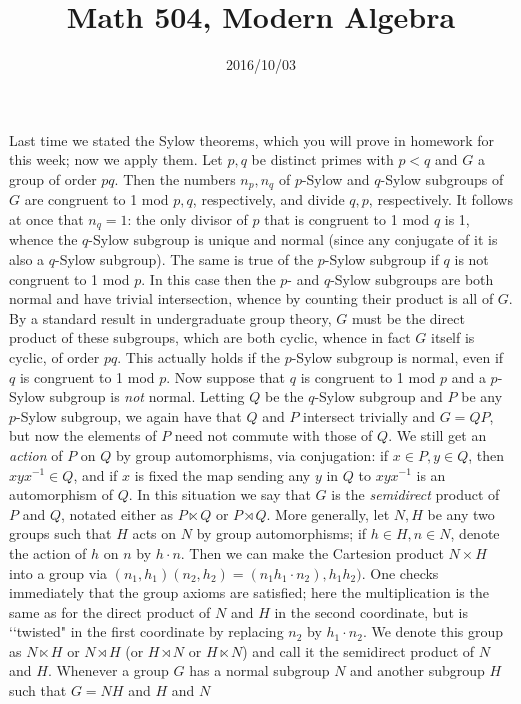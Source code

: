 \documentclass[10pt]{article} \usepackage{amsmath, amssymb}
\title{Math 504, Modern Algebra} \date{2016/10/03}
\begin{document}
\maketitle

Last time we stated the Sylow theorems, which you will prove in homework
for this week; now we apply them. Let $p,q$ be distinct primes with
$p<q$ and $G$ a group of order $pq$. Then the numbers $n_p,n_q$ of
$p$-Sylow and $q$-Sylow subgroups of $G$ are congruent to 1 mod $p,q$,
respectively, and divide $q,p$, respectively. It follows at once that
$n_q = 1$: the only divisor of $p$ that is congruent to 1 mod $q$ is 1,
whence the $q$-Sylow subgroup is unique and normal (since any conjugate
of it is also a $q$-Sylow subgroup). The same is true of the $p$-Sylow
subgroup if $q$ is not congruent to 1 mod $p$. In this case then the
$p$- and $q$-Sylow subgroups are both normal and have trivial
intersection, whence by counting their product is all of $G$. By a
standard result in undergraduate group theory, $G$ must be the direct
product of these subgroups, which are both cyclic, whence in fact $G$
itself is cyclic, of order $pq$. This actually holds if the $p$-Sylow
subgroup is normal, even if $q$ is congruent to 1 mod $p$. Now suppose
that $q$ is congruent to 1 mod $p$ and a $p$-Sylow subgroup is {\sl not}
normal. Letting $Q$ be the $q$-Sylow subgroup and $P$ be any $p$-Sylow
subgroup, we again have that $Q$ and $P$ intersect trivially and $G =
QP$, but now the elements of $P$ need not commute with those of $Q$. We
still get an {\sl action} of $P$ on $Q$ by group automorphisms, via
conjugation: if $x\in P,y\in Q$, then $xyx^{-1}\in Q$, and if $x$ is
fixed the map sending any $y$ in $Q$ to $xyx^{-1}$ is an automorphism of
$Q$. In this situation we say that $G$ is the {\sl semidirect} product
of $P$ and $Q$, notated either as $P\ltimes Q$ or $P\rtimes Q$. More
generally, let $N,H$ be any two groups such that $H$ acts on $N$ by
group automorphisms; if $h\in H,n\in N$, denote the action of $h$ on $n$
by $h\cdot n$. Then we can make the Cartesion product $N\times H$ into a
group via $(n_1,h_1) (n_2,h_2) = (n_1 h_1\cdot n_2),h_1 h_2)$. One
checks immediately that the group axioms are satisfied; here the
multiplication is the same as for the direct product of $N$ and $H$ in
the second coordinate, but is \lq\lq twisted" in the first coordinate by
replacing $n_2$ by $h_1\cdot n_2$. We denote this group as $N\ltimes H$
or $N\rtimes H$ (or $H\rtimes N$ or $H\ltimes N$) and call it the
semidirect product of $N$ and $H$. Whenever a group $G$ has a normal
subgroup $N$ and another subgroup $H$ such that $G = NH$ and $H$ and $N$
\end{document}
